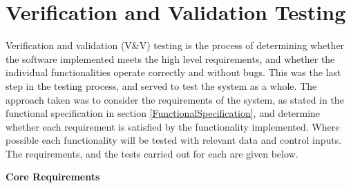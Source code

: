 
\section{Verification and Validation Testing} \label{ValidationTesting}
Verification and validation (V\&V) testing \cite{VerificationTesting} is the process of determining whether the software implemented meets the high level requirements, and whether the individual functionalities operate correctly and without bugs. This was the last step in the testing process, and served to test the system as a whole. The approach taken was to consider the requirements of the system, as stated in the functional specification in section \ref{FunctionalSpecification}, and determine whether each requirement is satisfied by the functionality implemented. Where possible each functionality will be tested with relevant data and control inputs. The requirements, and the tests carried out for each are given below.

\noindent\textbf{Core Requirements}

